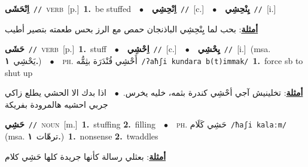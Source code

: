 \documentclass[10pt,a4paper,twoside]{article} %
\begin{document}
\begin{multicols}{2}
{\setlength\topsep{0pt}\textbf{\foreignlanguage{arabic}{اِنْحَشَى}}\ {\color{gray}\texttt{//}\color{black}}\ \textsc{verb}\ [p.]\ \textbf{1.}~be stuffed\ \ $\bullet$\ \ \setlength\topsep{0pt}\textbf{\foreignlanguage{arabic}{اِنْحِشِي}}\ {\color{gray}\texttt{//}\color{black}}\ [c.]\ \ $\bullet$\ \ \setlength\topsep{0pt}\textbf{\foreignlanguage{arabic}{يِنْحِشِي}}\ {\color{gray}\texttt{//}\color{black}}\ [i.]\  \begin{flushright}\color{gray}\foreignlanguage{arabic}{\textbf{\underline{\foreignlanguage{arabic}{أمثلة}}}: بحب لما يِنْحِشِي الباذنجان حمص مع الرز بحس طعمته بتصير أطيب}\end{flushright}\color{black}} \vspace{2mm}

{\setlength\topsep{0pt}\textbf{\foreignlanguage{arabic}{حَشَى}}\ {\color{gray}\texttt{//}\color{black}}\ \textsc{verb}\ [p.]\ \textbf{1.}~stuff\ \ $\bullet$\ \ \setlength\topsep{0pt}\textbf{\foreignlanguage{arabic}{اِحْشِي}}\ {\color{gray}\texttt{//}\color{black}}\ [c.]\ \ $\bullet$\ \ \setlength\topsep{0pt}\textbf{\foreignlanguage{arabic}{يِحْشِي}}\ {\color{gray}\texttt{//}\color{black}}\ [i.]\ \color{gray}(msa. \foreignlanguage{arabic}{يَحْشِي}~\foreignlanguage{arabic}{\textbf{١.}})\color{black}\ \ $\bullet$\ \ \textsc{ph.} \color{gray} \foreignlanguage{arabic}{أَحْشِي قُنْدَرَة بثِمُّه}\color{black}\ {\color{gray}\texttt{/{\sffamily ʔaħʃi kundara b(t)immak}/}\color{black}}\ \textbf{1.}~force sb to shut up\  \begin{flushright}\color{gray}\foreignlanguage{arabic}{\textbf{\underline{\foreignlanguage{arabic}{أمثلة}}}: تخلينيش آجي أحْشِي كندرة بثمه، خليه يخرس.\ $\bullet$\ \  اذا بدك الا الحشي يطلع زاكي جربي احشيه هالمرودة بفريكة}\end{flushright}\color{black}} \vspace{2mm}

{\setlength\topsep{0pt}\textbf{\foreignlanguage{arabic}{حَشِي}}\ {\color{gray}\texttt{//}\color{black}}\ \textsc{noun}\ [m.]\ \textbf{1.}~stuffing  \textbf{2.}~filling\ \ $\bullet$\ \ \textsc{ph.} \color{gray} \foreignlanguage{arabic}{حَشِي كَلَام}\color{black}\ {\color{gray}\texttt{/{\sffamily ħaʃi kalaːm}/}\color{black}}\ \color{gray} (msa. \foreignlanguage{arabic}{ترهّات}~\foreignlanguage{arabic}{\textbf{١.}})\color{black}\ \textbf{1.}~nonsense  \textbf{2.}~twaddles\  \begin{flushright}\color{gray}\foreignlanguage{arabic}{\textbf{\underline{\foreignlanguage{arabic}{أمثلة}}}: بعثلي رسالة كأنها جريدة كلها حَشِي كلام}\end{flushright}\color{black}} \vspace{2mm}


\end{multicols}
\end{document}
